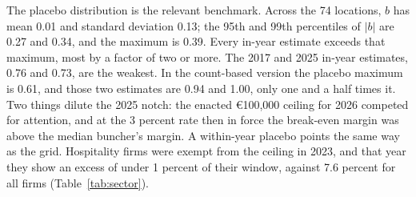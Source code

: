 \documentclass[12pt]{article}
\begin{document}
The placebo distribution is the relevant benchmark. Across the 74 locations, $b$ has mean 0.01 and standard deviation 0.13; the 95th and 99th percentiles of $|b|$ are 0.27 and 0.34, and the maximum is 0.39. Every in-year estimate exceeds that maximum, most by a factor of two or more. The 2017 and 2025 in-year estimates, 0.76 and 0.73, are the weakest. In the count-based version the placebo maximum is 0.61, and those two estimates are 0.94 and 1.00, only one and a half times it. Two things dilute the 2025 notch: the enacted \euro{}100,000 ceiling for 2026 competed for attention, and at the 3 percent rate then in force the break-even margin was above the median buncher's margin. A within-year placebo points the same way as the grid. Hospitality firms were exempt from the ceiling in 2023, and that year they show an excess of under 1 percent of their window, against 7.6 percent for all firms (Table~\ref{tab:sector}).
\end{document}
